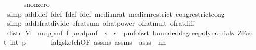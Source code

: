 \begin{isabellebody}
\ \ \ \ \isamarkupfalse%
\ s{}{\isacharunderscore}{\kern0pt}nonzero\ \isamarkupfalse%
\ {\isacharparenleft}{\kern0pt}simp\ add{\isacharcolon}{\kern0pt}f{\isacharprime}{\kern0pt}{\isacharunderscore}{\kern0pt}def\ f{}{\isacharunderscore}{\kern0pt}def\ f{}{\isacharunderscore}{\kern0pt}def\ f{\isacharunderscore}{\kern0pt}def\ median{\isacharunderscore}{\kern0pt}rat\ median{\isacharunderscore}{\kern0pt}restrict\ cong{\isacharcolon}{\kern0pt}restrict{\isacharunderscore}{\kern0pt}cong{\isacharparenright}{\kern0pt}\isanewline
\ \ \ \ \isamarkupfalse%
\ {\isacharparenleft}{\kern0pt}simp\ add{\isacharcolon}{\kern0pt}of{\isacharunderscore}{\kern0pt}rat{\isacharunderscore}{\kern0pt}divide\ of{\isacharunderscore}{\kern0pt}rat{\isacharunderscore}{\kern0pt}sum\ of{\isacharunderscore}{\kern0pt}rat{\isacharunderscore}{\kern0pt}power\ of{\isacharunderscore}{\kern0pt}rat{\isacharunderscore}{\kern0pt}mult\ of{\isacharunderscore}{\kern0pt}rat{\isacharunderscore}{\kern0pt}diff{\isacharparenright}{\kern0pt}\isanewline
\isanewline
\ \ \isamarkupfalse%
\ distr{\isacharprime}{\kern0pt}{\isacharcolon}{\kern0pt}\ {\isachardoublequoteopen}M\ {\isacharequal}{\kern0pt}\ map{\isacharunderscore}{\kern0pt}pmf\ f\ {\isacharparenleft}{\kern0pt}prod{\isacharunderscore}{\kern0pt}pmf\ \ {\isacharparenleft}{\kern0pt}{\isacharbraceleft}{\kern0pt}{}{\isachardot}{\kern0pt}{\isachardot}{\kern0pt}{\isacharless}{\kern0pt}s\ {\isasymtimes}\ {\isacharbraceleft}{\kern0pt}{}{\isachardot}{\kern0pt}{\isachardot}{\kern0pt}{\isacharless}{\kern0pt}s\ {\isacharparenleft}{\kern0pt}{\isasymlambda}{\isacharunderscore}{\kern0pt}{\isachardot}{\kern0pt}\ pmf{\isacharunderscore}{\kern0pt}of{\isacharunderscore}{\kern0pt}set\ {\isacharparenleft}{\kern0pt}bounded{\isacharunderscore}{\kern0pt}degree{\isacharunderscore}{\kern0pt}polynomials\ {\isacharparenleft}{\kern0pt}ZFact\ {\isacharparenleft}{\kern0pt}int\ p{\isacharparenright}{\kern0pt}{\isacharparenright}{\kern0pt}\ {}{\isacharparenright}{\kern0pt}{\isacharparenright}{\kern0pt}{\isacharparenright}{\kern0pt}{\isachardoublequoteclose}\isanewline
\ \ \ \ \isamarkupfalse%
\ f{}{\isacharunderscore}{\kern0pt}alg{\isacharunderscore}{\kern0pt}sketch{\isacharbrackleft}{\kern0pt}OF\ assms{\isacharparenleft}{\kern0pt}{}{\isacharparenright}{\kern0pt}\ assms{\isacharparenleft}{\kern0pt}{}{\isacharparenright}{\kern0pt}{\isacharcomma}{\kern0pt}\ \ as{\isacharequal}{\kern0pt}{\isachardoublequoteopen}as{\isachardoublequoteclose}\ \ n{\isacharequal}{\kern0pt}{\isachardoublequoteopen}n{\isachardoublequoteclose}{\isacharbrackright}{\kern0pt}\isanewline

\end{isabellebody}
